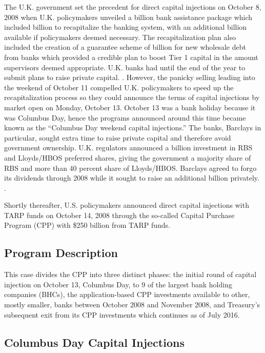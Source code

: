 \documentclass[12pt]{article}
\begin{document}
The U.K. government set the precedent for direct capital injections on October 8, 2008 when U.K. policymakers unveiled a  billion bank assistance package which included  billion to recapitalize the banking system, with an additional  billion available if policymakers deemed necessary. The recapitalization plan also included the creation of a guarantee scheme of  billion for new wholesale debt from banks which provided a credible plan to boost Tier 1 capital in the amount supervisors deemed appropriate. U.K. banks had until the end of the year to submit plans to raise private capital. \citep{UKPlans}. However, the panicky selling leading into the weekend of October 11 compelled U.K. policymakers to speed up the recapitalization process so they could announce the terms of capital injections by market open on Monday, October 13. October 13 was a bank holiday because it was Columbus Day, hence the programs announced around this time became known as the ``Columbus Day weekend capital injections.''  The banks, Barclays in particular, sought extra time to raise private capital and therefore avoid government ownership. U.K. regulators announced a  billion investment in RBS and Lloyds/HBOS preferred shares, giving the government a majority share of RBS and more than 40 percent share of Lloyds/HBOS. Barclays agreed to forgo its dividends through 2008 while it sought to raise an additional  billion privately. \citep{UKActual}.

Shortly thereafter, U.S. policymakers announced direct capital injections with TARP funds on October 14, 2008 through the so-called Capital Purchase Program (CPP) with \$250 billion from TARP funds.

\subsection{Program Description}

This case divides the CPP into three distinct phases: the initial round of capital injection on October 13, Columbus Day, to 9 of the largest bank holding companies (BHCs), the application-based CPP investments available to other, mostly smaller, banks between October 2008 and November 2008, and Treasury's subsequent exit from its CPP investments which continues as of July 2016.

\subsection*{Columbus Day Capital Injections}
\end{document}

